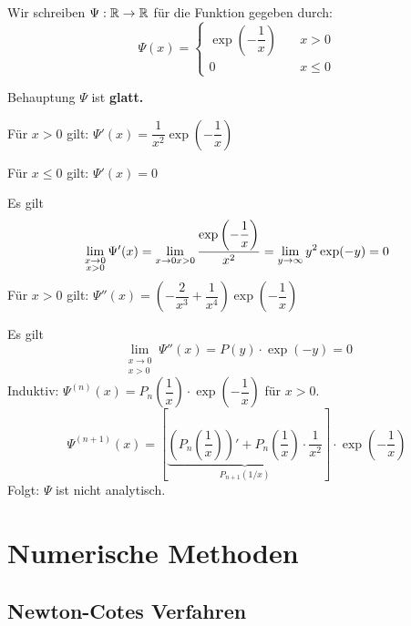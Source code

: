\documentclass[main.tex]{subfiles}
\begin{document}
\begin{Beispiel}
  Wir schreiben $\Psi: \mathbb{R} \to \mathbb{R}$ für die Funktion gegeben durch:
  $$\Psi(x)= \left\{\begin{aligned}
    \exp\left(-\dfrac{1}{x}\right) & \quad x > 0\\
    0 & \quad x \leq 0
  \end{aligned}\right.$$
  \begin{center}
  \end{center}

  Behauptung $\Psi$ ist \textbf{glatt.}

  Für $x > 0$ gilt: $\Psi'(x) = \dfrac{1}{x^2} \exp\left(-\dfrac{1}{x}\right)$

  Für $x \leq 0$ gilt: $\Psi'(x) = 0$

  Es gilt
  $$\lim \limits_{\substack{x \to 0 \\ x > 0}} \Psi'(x) = \lim \limits_{x \to 0 \\ x > 0} \dfrac{\exp\left(-\dfrac{1}{x}\right)}{x^2} = \lim \limits_{y \to \infty} y^2 \exp(-y) = 0$$
  Für $x > 0$ gilt: $\Psi''(x) = \left(-\dfrac{2}{x^3} + \dfrac{1}{x^4}\right) \exp\left(-\dfrac{1}{x}\right)$

  Es gilt
  $$\lim \limits_{\substack{x \to 0 \\ x > 0}} \Psi''(x) = P(y)\cdot\exp(-y) = 0$$
  Induktiv: $\Psi^{(n)}(x) = P_n\left(\dfrac{1}{x}\right) \cdot \exp\left(-\dfrac{1}{x}\right)$ für $x > 0$.
  $$\Psi^{(n+1)}(x) =
  \left[
   \underbrace{ \left(P_n\left(\dfrac{1}{x}\right)\right)' + P_n\left(\dfrac{1}{x}\right)\cdot \dfrac{1}{x^2}}_{P_{n+1}(1/x)}
  \right] \cdot \exp\left(-\dfrac{1}{x}\right)$$
  Folgt: $\Psi$ ist nicht analytisch.
\end{Beispiel}


\section{Numerische Methoden}

\subsection{Newton-Cotes Verfahren}
\end{document}

